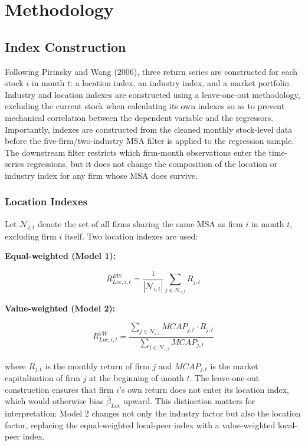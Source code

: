 \documentclass[
  12pt,
]{article}
\begin{document}
\section{Methodology}\label{methodology}

\subsection{Index Construction}\label{index-construction}

Following Pirinsky and Wang (2006), three return series are constructed
for each stock \(i\) in month \(t\): a location index, an industry
index, and a market portfolio. Industry and location indexes are
constructed using a leave-one-out methodology, excluding the current
stock when calculating its own indexes so as to prevent mechanical
correlation between the dependent variable and the regressors.
Importantly, indexes are constructed from the cleaned monthly
stock-level data before the five-firm/two-industry MSA filter is applied
to the regression sample. The downstream filter restricts which
firm-month observations enter the time-series regressions, but it does
not change the composition of the location or industry index for any
firm whose MSA does survive.

\subsubsection{Location Indexes}\label{location-indexes}

Let \(\mathcal{N}_{i,t}\) denote the set of all firms sharing the same
MSA as firm \(i\) in month \(t\), excluding firm \(i\) itself. Two
location indexes are used:

\textbf{Equal-weighted (Model 1):}

\[R_{Loc,i,t}^{EW} = \frac{1}{|\mathcal{N}_{i,t}|} \sum_{j \in \mathcal{N}_{i,t}} R_{j,t}\]

\textbf{Value-weighted (Model 2):}

\[R_{Loc,i,t}^{VW} = \frac{\sum_{j \in \mathcal{N}_{i,t}} MCAP_{j,t} \cdot R_{j,t}}{\sum_{j \in \mathcal{N}_{i,t}} MCAP_{j,t}}\]

\noindent where \(R_{j,t}\) is the monthly return of firm \(j\) and
\(MCAP_{j,t}\) is the market capitalization of firm \(j\) at the
beginning of month \(t\). The leave-one-out construction ensures that
firm \(i\)'s own return does not enter its location index, which would
otherwise bias \(\hat{\beta}_{Loc}\) upward. This distinction matters
for interpretation: Model 2 changes not only the industry factor but
also the location factor, replacing the equal-weighted local-peer index
with a value-weighted local-peer index.
\end{document}

